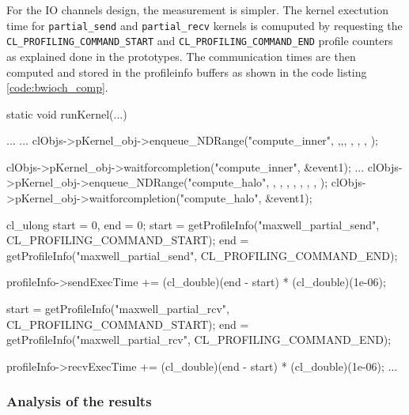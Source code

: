 For the IO channels design, the measurement is simpler. The kernel exectution time
for \texttt{partial\_send} and \texttt{partial\_recv} kernels is comuputed by requesting
the \texttt{CL\_PROFILING\_COMMAND\_START} and \texttt{CL\_PROFILING\_COMMAND\_END} profile counters
as explained done in the prototypes. The communication times are then computed and stored
in the profileinfo buffers as shown in the code listing \ref{code:bwioch_comp}.
\begin{CppCode}[caption=Send and receive communication time computation changes for IO channels designs, frame=tlrb, label=code:bwioch_comp]
static void runKernel(...)
{
...
...
    clObjs->pKernel_obj->enqueue_NDRange("compute_inner",  ,,, , , , );

    clObjs->pKernel_obj->waitforcompletion("compute_inner", &event1);
...
    clObjs->pKernel_obj->enqueue_NDRange("compute_halo", , , , , , , , );
    clObjs->pKernel_obj->waitforcompletion("compute_halo", &event1);

    cl_ulong start = 0, end = 0;
    start = getProfileInfo("maxwell_partial_send", CL_PROFILING_COMMAND_START);
    end = getProfileInfo("maxwell_partial_send", CL_PROFILING_COMMAND_END);

    profileInfo->sendExecTime += (cl_double)(end - start) * (cl_double)(1e-06);

    start = getProfileInfo("maxwell_partial_rcv", CL_PROFILING_COMMAND_START);
    end = getProfileInfo("maxwell_partial_rcv", CL_PROFILING_COMMAND_END);

    profileInfo->recvExecTime += (cl_double)(end - start) * (cl_double)(1e-06);
...
}
\end{CppCode}


\subsubsection{Analysis of the results}

